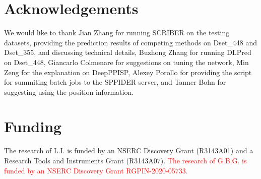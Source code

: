\documentclass{bioinfo}
\newcommand{\mySecondColor}{red}
\begin{document}
\section*{Acknowledgements}
We would like to thank Jian Zhang for running SCRIBER on the testing datasets, providing the prediction results of competing methods on Dset\_448 and Dset\_355, and discussing technical details, Buzhong Zhang for running DLPred on Dset\_448, Giancarlo Colmenare for suggestions on tuning the network, Min Zeng for the explanation on DeepPPISP, Alexey Porollo for providing the script for summiting batch jobs to the SPPIDER server, and Tanner Bohn for suggesting using the position information.

\section*{Funding}
The research of L.I. is funded by an NSERC Discovery Grant (R3143A01) and a Research Tools and Instruments Grant (R3143A07). \textcolor{\mySecondColor}{The research of G.B.G. is funded by an NSERC Discovery Grant RGPIN-2020-05733.}



%

\end{document}
